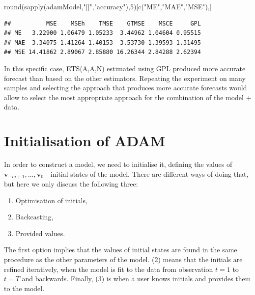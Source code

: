 \documentclass[
]{book}
\newenvironment{Shaded}{\begin{snugshade}}{\end{snugshade}}
\newcommand{\DecValTok}[1]{\textcolor[rgb]{0.00,0.00,0.81}{#1}}
\newcommand{\FunctionTok}[1]{\textcolor[rgb]{0.00,0.00,0.00}{#1}}
\newcommand{\NormalTok}[1]{#1}
\newcommand{\StringTok}[1]{\textcolor[rgb]{0.31,0.60,0.02}{#1}}
\providecommand{\tightlist}{%
  \setlength{\itemsep}{0pt}\setlength{\parskip}{0pt}}
\theoremstyle{definition}
\theoremstyle{definition}
\theoremstyle{definition}
\theoremstyle{definition}
\theoremstyle{remark}
\begin{document}
\begin{Shaded}
\begin{Highlighting}[]
\FunctionTok{round}\NormalTok{(}\FunctionTok{sapply}\NormalTok{(adamModel,}\StringTok{"[["}\NormalTok{,}\StringTok{"accuracy"}\NormalTok{),}\DecValTok{5}\NormalTok{)[}\FunctionTok{c}\NormalTok{(}\StringTok{"ME"}\NormalTok{,}\StringTok{"MAE"}\NormalTok{,}\StringTok{"MSE"}\NormalTok{),]}
\end{Highlighting}
\end{Shaded}

\begin{verbatim}
##          MSE    MSEh    TMSE    GTMSE    MSCE     GPL
## ME   3.22900 1.06479 1.05233  3.44962 1.04604 0.95515
## MAE  3.34075 1.41264 1.40153  3.53730 1.39593 1.31495
## MSE 14.41862 2.89067 2.85880 16.26344 2.84288 2.62394
\end{verbatim}

In this specific case, ETS(A,A,N) estimated using GPL produced more accurate forecast than based on the other estimators. Repeating the experiment on many samples and selecting the approach that produces more accurate forecasts would allow to select the most appropriate approach for the combination of the model + data.

\hypertarget{ADAMInitialisation}{%
\section{Initialisation of ADAM}\label{ADAMInitialisation}}

In order to construct a model, we need to initialise it, defining the values of \(\mathbf{v}_{-m+1}, \dots, \mathbf{v}_0\) - initial states of the model. There are different ways of doing that, but here we only discuss the following three:

\begin{enumerate}
\def\labelenumi{\arabic{enumi}.}
\tightlist
\item
  Optimisation of initials,
\item
  Backcasting,
\item
  Provided values.
\end{enumerate}

The first option implies that the values of initial states are found in the same procedure as the other parameters of the model. (2) means that the initials are refined iteratively, when the model is fit to the data from observation \(t=1\) to \(t=T\) and backwards. Finally, (3) is when a user knows initials and provides them to the model.
\end{document}
